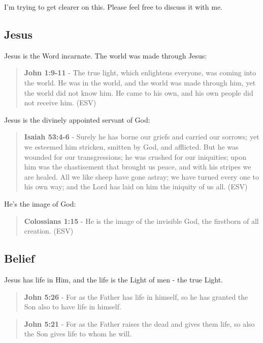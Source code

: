 \documentclass[11pt]{article}
\begin{document}
I'm trying to get clearer on this.
Please feel free to discuss it with me.

\subsection{Jesus}
\label{sec:org35f9099}
Jesus is the Word incarnate. The world was made through Jesus:

\begin{quote}
\textbf{John 1:9-11} - The true light, which enlightens everyone, was coming into the world. He was in the world, and the world was made through him, yet the world did not know him. He came to his own, and his own people did not receive him. (ESV)
\end{quote}

Jesus is the divinely appointed servant of God:

\begin{quote}
\textbf{Isaiah 53:4-6} - Surely he has borne our griefs and carried our sorrows; yet we esteemed him stricken, smitten by God, and afflicted. But he was wounded for our transgressions; he was crushed for our iniquities; upon him was the chastisement that brought us peace, and with his stripes we are healed. All we like sheep have gone astray; we have turned every one to his own way; and the Lord has laid on him the iniquity of us all. (ESV)
\end{quote}

He's the image of God:

\begin{quote}
\textbf{Colossians 1:15} - He is the image of the invisible God, the firstborn of all creation. (ESV)
\end{quote}

\subsection{Belief}
\label{sec:org09af273}
Jesus has life in Him, and the life is the Light of men - the true Light.

\begin{quote}
\textbf{John 5:26} - For as the Father has life in himself, so he has granted the Son also to have life in himself.
\end{quote}

\begin{quote}
\textbf{John 5:21} - For as the Father raises the dead and gives them life, so also the Son gives life to whom he will.
\end{quote}
\end{document}

